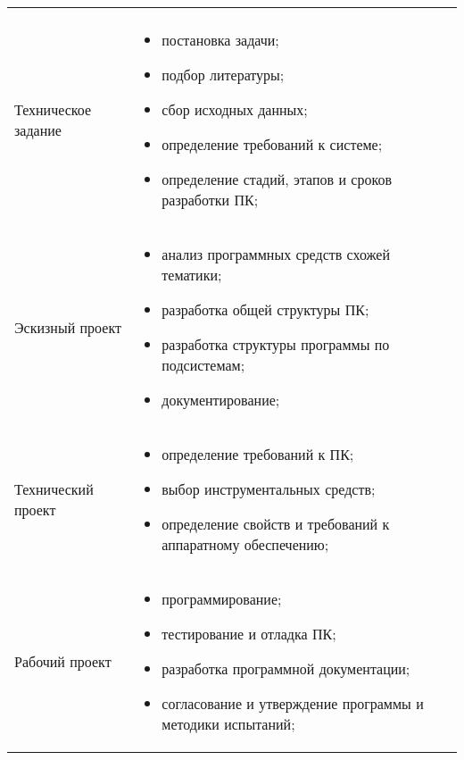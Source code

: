 \begin{center}
\begin{longtable}{|l|l|}
\hline
\endlastfoot
\\
		Техническое задание & \begin{parbox}{5in} {
						\begin{itemize}
							\item постановка задачи;
							\item подбор литературы;
							\item сбор исходных данных;
							\item определение требований к системе;
							\item определение стадий, этапов и сроков разработки ПК;
						\end{itemize} }  
					\end{parbox} \\
	\hline
		Эскизный проект & \begin{parbox}{5in} {
					\begin{itemize} 
						\item анализ программных средств схожей тематики;
						\item разработка общей структуры ПК;
						\item разработка структуры программы по подсистемам;
						\item документирование;
					\end{itemize} }
				\end{parbox} \\
	\hline
		Технический проект & \begin{parbox}{5in} {
					\begin{itemize} 
						\item определение требований к ПК;
						\item выбор инструментальных средств;
						\item определение свойств и требований к аппаратному обеспечению;
					\end{itemize} } 
				\end{parbox} \\
	\hline
		Рабочий проект & \begin{parbox}{5in} {
					\begin{itemize} 
						\item программирование;
						\item тестирование и отладка ПК;
						\item разработка программной документации;
						\item согласование и утверждение программы и методики испытаний;
					\end{itemize} }

\end{parbox}
\end{longtable}
\end{center}
